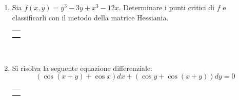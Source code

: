 \documentclass[12pt,a4paper]{report}\pagenumbering{roman}
\begin{document}
\begin{enumerate}
\item Sia $f(x,y)=y^3-3y+x^3-12x$. Determinare i punti critici di 
$f$ e classificarli con il metodo della matrice Hessiania.\\
\hspace*{-3.5cm}\begin{tabular}{c}\hline\\\hspace*{16cm}\end{tabular}\\
\hspace*{-3.5cm}{\bf SVOLGIMENTO:}\pagebreak

\item Si risolva la seguente equazione differenziale:
$$(\cos(x+y)+\cos x)dx+(\cos y+\cos(x+y))dy=0$$
\hspace*{-3.5cm}\begin{tabular}{c}\hline\\\hspace*{16cm}\end{tabular}\\
\hspace*{-3.5cm}{\bf SVOLGIMENTO:}

\end{enumerate}
\end{document}
